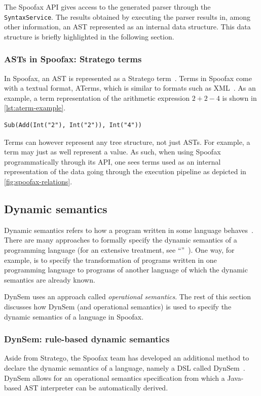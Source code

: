The Spoofax API gives access to the generated parser through the
\texttt{SyntaxService}. The results obtained by executing the parser results in,
among other information, an AST represented as an internal data structure. This
data structure is briefly highlighted in the following section.

\subsubsection{ASTs in Spoofax: Stratego terms}
\label{sec:asts-spoof-strat}
In Spoofax, an AST is represented as a Stratego term~\cite{Kats10a}. Terms in
Spoofax come with a textual format, ATerms, which is similar to formats such as
XML~\cite{Brand00}. As an example, a term representation of the arithmetic
expression $2 + 2 - 4$ is shown in \cref{lst:aterm-example}.

\begin{lstlisting}[caption={An example ATerm representation of an arithmetic
expression.},language=aterm,label={lst:aterm-example}]
Sub(Add(Int("2"), Int("2")), Int("4"))
\end{lstlisting}

Terms can however represent any tree structure, not just ASTs. For example, a
term may just as well represent a value. As such, when using Spoofax
programmatically through its API, one sees terms used as an internal
representation of the data going through the execution pipeline as depicted in
\cref{fig:spoofax-relations}.

\subsection{Dynamic semantics}
\label{ssec:dynamic-semantics}
Dynamic semantics refers to how a program written in some language
behaves~\cite{Winskel93}. There are many approaches to formally specify the
dynamic semantics of a programming language (for an extensive treatment, see
``''~\cite{Winskel93}). One way, for example, is
to specify the transformation of programs written in one programming language to
programs of another language of which the dynamic semantics are already known.

DynSem uses an approach called \textit{operational semantics}. The rest of this
section discusses how DynSem (and operational semantics) is used to specify the
dynamic semantics of a language in Spoofax.

\subsubsection{DynSem: rule-based dynamic semantics}
\label{ssec:dynsem}
Aside from Stratego, the Spoofax team has developed an additional method to
declare the dynamic semantics of a language, namely a DSL called
DynSem~\cite{VerguNV15}. DynSem allows for an operational semantics
specification from which a Java-based AST interpreter can be automatically
derived.

